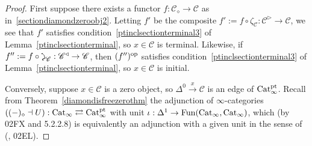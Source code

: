 \documentclass{tac}
\newcommand{\s}[1]{\mathscr{#1}}
\newcommand{\tx}[1]{\textnormal{#1}}
\DeclareRobustCommand{\atez}{\text{\reflectbox{$\zeta$}}}
\begin{document}
\begin{proof} First suppose there exists a functor $f : \s{C}_\diamond \to \s{C}$ as in~\ref{sectiondiamondzeroobj2}. Letting $f'$ be the composite $f':= f \circ \zeta_{\s{C}} : \s{C}^\triangleright \to \s{C}$, we see that $f'$ satisfies condition~\ref{ptinclsectionterminal3} of Lemma~\ref{ptinclsectionterminal}, so $x \in \s{C}$ is terminal.  Likewise, if $f'' := f \circ \atez_{\s{C}} : \s{C}^\triangleleft \to \s{C}$, then $(f'')^\tx{op}$ satisfies condition~\ref{ptinclsectionterminal3} of Lemma~\ref{ptinclsectionterminal}, so $x \in \s{C}$ is initial.

\hfill

Conversely, suppose $x\in \s{C}$ is a zero object, so $\Delta^0 \xrightarrow{x} \s{C}$ is an edge of $\tx{Cat}_\infty^\tx{pt}$.  Recall from Theorem~\ref{diamondisfreezerothm} the adjunction of $\infty$-categories $\left( (-)_\diamond \dashv U \right) : \tx{Cat}_\infty \rightleftarrows \tx{Cat}_\infty^\tx{pt}$ with unit $\iota : \Delta^1 \to \tx{Fun}(\tx{Cat}_\infty, \tx{Cat}_\infty)$, which (by \cite{kerodon} 02FX and \cite{htt} 5.2.2.8) is equivalently an adjunction with a given unit in the sense of (\cite{kerodon}, 02EL).  


\end{proof}
\end{document}
